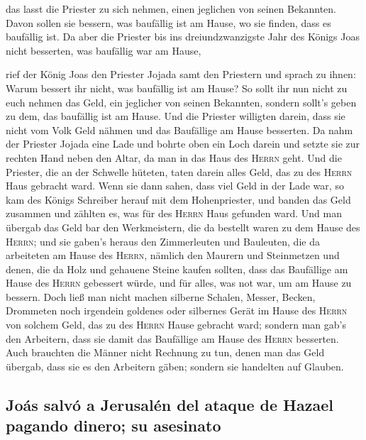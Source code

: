  das lasst die Priester zu sich nehmen, einen jeglichen
von seinen Bekannten. Davon sollen sie bessern, was baufällig ist am
Hause, wo sie finden, dass es baufällig ist.  Da aber die
Priester bis ins dreiundzwanzigste Jahr des Königs Joas nicht besserten,
was baufällig war am Hause,

 rief der König Joas den Priester Jojada samt den
Priestern und sprach zu ihnen: Warum bessert ihr nicht, was baufällig
ist am Hause? So sollt ihr nun nicht zu euch nehmen das Geld, ein
jeglicher von seinen Bekannten, sondern sollt's geben zu dem, das
baufällig ist am Hause.  Und die Priester willigten
darein, dass sie nicht vom Volk Geld nähmen und das Baufällige am Hause
besserten.  Da nahm der Priester Jojada eine Lade und
bohrte oben ein Loch darein und setzte sie zur rechten Hand neben den
Altar, da man in das Haus des \textsc{Herrn} geht. Und die Priester, die
an der Schwelle hüteten, taten darein alles Geld, das zu des
\textsc{Herrn} Haus gebracht ward.  Wenn sie dann sahen,
dass viel Geld in der Lade war, so kam des Königs Schreiber herauf mit
dem Hohenpriester, und banden das Geld zusammen und zählten es, was für
des \textsc{Herrn} Haus gefunden ward.  Und man übergab
das Geld bar den Werkmeistern, die da bestellt waren zu dem Hause des
\textsc{Herrn}; und sie gaben's heraus den Zimmerleuten und Bauleuten,
die da arbeiteten am Hause des \textsc{Herrn},  nämlich
den Maurern und Steinmetzen und denen, die da Holz und gehauene Steine
kaufen sollten, dass das Baufällige am Hause des \textsc{Herrn}
gebessert würde, und für alles, was not war, um am Hause zu bessern.
 Doch ließ man nicht machen silberne Schalen, Messer,
Becken, Drommeten noch irgendein goldenes oder silbernes Gerät im Hause
des \textsc{Herrn} von solchem Geld, das zu des \textsc{Herrn} Hause
gebracht ward;  sondern man gab's den Arbeitern, dass sie
damit das Baufällige am Hause des \textsc{Herrn} besserten.
 Auch brauchten die Männer nicht Rechnung zu tun, denen
man das Geld übergab, dass sie es den Arbeitern gäben; sondern sie
handelten auf Glauben.

\hypertarget{jouxe1s-salvuxf3-a-jerusaluxe9n-del-ataque-de-hazael-pagando-dinero-su-asesinato}{%
\subsection{Joás salvó a Jerusalén del ataque de Hazael pagando dinero;
su
asesinato}\label{jouxe1s-salvuxf3-a-jerusaluxe9n-del-ataque-de-hazael-pagando-dinero-su-asesinato}}

